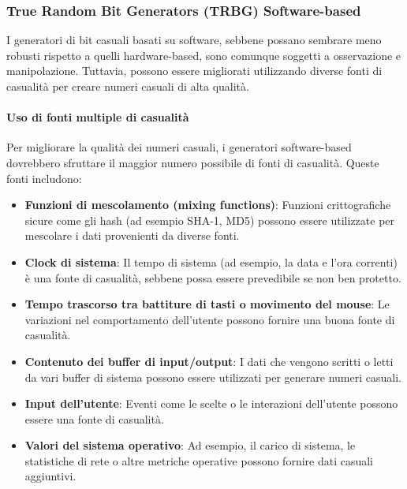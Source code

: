 \documentclass{report}
\begin{document}
\subsubsection{True Random Bit Generators (TRBG) Software-based}

I generatori di bit casuali basati su software, sebbene possano sembrare meno robusti rispetto a quelli hardware-based, sono comunque soggetti a osservazione e manipolazione. Tuttavia, possono essere migliorati utilizzando diverse fonti di casualità per creare numeri casuali di alta qualità.

\paragraph{Uso di fonti multiple di casualità}
Per migliorare la qualità dei numeri casuali, i generatori software-based dovrebbero sfruttare il maggior numero possibile di fonti di casualità. Queste fonti includono:
\begin{itemize}
    \item \textbf{Funzioni di mescolamento (mixing functions)}: Funzioni crittografiche sicure come gli hash (ad esempio SHA-1, MD5) possono essere utilizzate per mescolare i dati provenienti da diverse fonti.
    \item \textbf{Clock di sistema}: Il tempo di sistema (ad esempio, la data e l'ora correnti) è una fonte di casualità, sebbene possa essere prevedibile se non ben protetto.
    \item \textbf{Tempo trascorso tra battiture di tasti o movimento del mouse}: Le variazioni nel comportamento dell'utente possono fornire una buona fonte di casualità.
    \item \textbf{Contenuto dei buffer di input/output}: I dati che vengono scritti o letti da vari buffer di sistema possono essere utilizzati per generare numeri casuali.
    \item \textbf{Input dell'utente}: Eventi come le scelte o le interazioni dell'utente possono essere una fonte di casualità.
    \item \textbf{Valori del sistema operativo}: Ad esempio, il carico di sistema, le statistiche di rete o altre metriche operative possono fornire dati casuali aggiuntivi.
\end{itemize}
\end{document}

